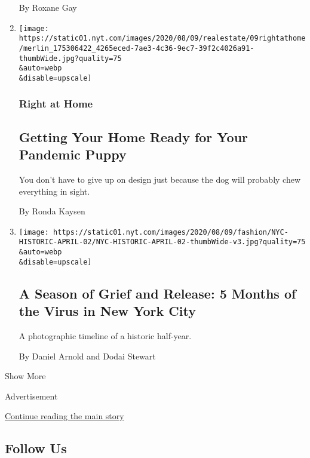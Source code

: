 \begin{enumerate}
  By Roxane Gay
\item
  \href{/2020/08/07/realestate/pandemic-puppy-home-design.html}{}

  \texttt{[image: https://static01.nyt.com/images/2020/08/09/realestate/09rightathome/merlin\_175306422\_4265eced-7ae3-4c36-9ec7-39f2c4026a91-thumbWide.jpg?quality=75\\\&auto=webp\\\&disable=upscale]}

  \hypertarget{right-at-home}{%
  \subsubsection{Right at Home}\label{right-at-home}}

  \hypertarget{getting-your-home-ready-for-your-pandemic-puppy}{%
  \subsection{Getting Your Home Ready for Your Pandemic
  Puppy}\label{getting-your-home-ready-for-your-pandemic-puppy}}

  You don't have to give up on design just because the dog will probably
  chew everything in sight.

  By Ronda Kaysen
\item
  \href{/2020/08/07/style/coronavirus-nyc-historic-season.html}{}

  \texttt{[image: https://static01.nyt.com/images/2020/08/09/fashion/NYC-HISTORIC-APRIL-02/NYC-HISTORIC-APRIL-02-thumbWide-v3.jpg?quality=75\\\&auto=webp\\\&disable=upscale]}

  \hypertarget{a-season-of-grief-and-release-5-months-of-the-virus-in-new-york-city-1}{%
  \subsection{A Season of Grief and Release: 5 Months of the Virus in
  New York
  City}\label{a-season-of-grief-and-release-5-months-of-the-virus-in-new-york-city-1}}

  A photographic timeline of a historic half-year.

  By Daniel Arnold and Dodai Stewart
\end{enumerate}

Show More

Advertisement

\protect\hyperlink{after-mid7}{Continue reading the main story}

\hypertarget{follow-us}{%
\subsection{Follow Us}\label{follow-us}}

